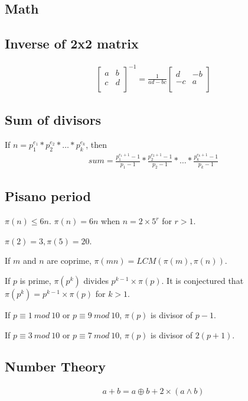 \documentclass[A4 paper, 12pt, oneside, landscape]{article}
\begin{document}
\begin{multicols}{2}
\section{Math}	
    \subsection{Inverse of 2x2 matrix}
    \begin{align*}
        \begin{bmatrix}
        a & b \\
        c & d \\
        \end{bmatrix} ^ {-1} = \frac{1}{ad - bc}
        \begin{bmatrix}
            d & -b \\
            -c & a \\
        \end{bmatrix}
    \end{align*}
    
    \subsection{Sum of divisors}
    If $n = p^{e_1}_1 * p^{e_2}_2 * \dots * p^{e_k}_k$, then
    \begin{align*}
        sum = \frac{p^{e_1 + 1}_1 - 1}{p_1 - 1} * \frac{p^{e_2 + 1}_2 - 1}{p_2 - 1} * \dots * \frac{p^{e_k + 1}_k - 1}{p_k - 1}
    \end{align*}
    
    \subsection{Pisano period}
    $\pi(n) \leq 6n.$ $\pi(n) = 6n$ when $n = 2 \times 5^r$ for $r > 1$. \par 
    $\pi(2) = 3, \pi(5) = 20$. \par 
    If $m$ and $n$ are coprime, $\pi(mn) = LCM(\pi(m), \pi(n))$. \par
    If $p$ is prime, $\pi(p^k)$ divides $p^{k - 1} \times \pi(p)$. It is conjectured that $\pi(p^k) = p^{k - 1} \times \pi(p)$ for $k > 1$. \par
    If $p \equiv 1 \ mod \ 10$ or $p \equiv 9 \ mod \ 10$, $\pi(p)$ is divisor of $p - 1$. \par 
    If $p \equiv 3 \ mod \ 10$ or $p \equiv 7 \ mod \ 10$, $\pi(p)$ is divisor of $2(p + 1)$.
    
    \subsection{Number Theory}
    \begin{align*}
        a + b = a \oplus b + 2 \times (a \wedge b)
    \end{align*}
    

\end{multicols}
\end{document}

